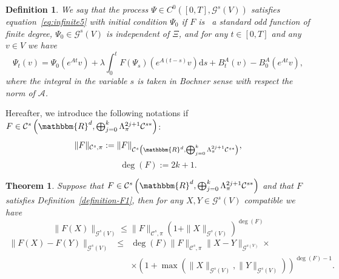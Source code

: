 \documentclass[11pt]{article}
\newcommand{\assign}{:=}
\newcommand{\asterisk}{\mathord{*}}
\newcommand{\mathd}{\mathrm{d}}
\newtheorem{definition}{Definition}
\newtheorem{theorem}{Theorem}
\begin{document}
\begin{definition}
  \label{definition_F2}We say that the process $\Psi \in C^0 ([0, T],
  \mathcal{G}^s (V))$ satisfies equation~{\eqref{eq:infinite5}} with initial
  condition $\Psi_0$ if $F$ is \ a standard odd function of finite degree,
  $\Psi_0 \in \mathcal{G}^s (V)$ is independent of $\Xi$, and for any $t \in
  [0, T]$ and any $v \in V$ we have
  \begin{equation}
    \Psi_t (v) = \Psi_0 (e^{A t} v) + \lambda \int_0^t F (\Psi_s) (e^{A (t -
    s)} v) \mathd s + B^A_t (v) - B_0^A (e^{A t} v) \label{eq:infinite2},
  \end{equation}
  where the integral in the variable $s$ is taken in Bochner sense with
  respect the norm of $\mathcal{A}$.
\end{definition}

Hereafter, we introduce the following notations if $F \in \mathcal{C}^s \left(
\mathbbm{R}^d, \bigoplus_{j = 0}^k \Lambda^{2 j + 1}_{\pi} \mathcal{C}^{s
\asterisk} \right)$:
\[ \| F \|_{\mathcal{C}^s, \pi} \assign \| F \|_{\mathcal{C}^s \left(
   \mathbbm{R}^d, \bigoplus_{j = 0}^k \Lambda^{2 j + 1}_{\pi} \mathcal{C}^{s
   \asterisk} \right)}, \]
\[ \deg (F) \assign 2 k + 1. \]
\begin{theorem}
  \label{theorem_drift}Suppose that $F \in \mathcal{C}^s \left( \mathbbm{R}^d,
  \bigoplus_{j = 0}^k \Lambda^{2 j + 1}_{\pi} \mathcal{C}^{s \asterisk}
  \right)$ and that $F$ satisfies Definition~\ref{definition-F1}, then for any
  $X, Y \in \mathcal{G}^s (V)$ compatible we have
  \begin{equation}
    \| F (X) \|_{\mathcal{G}^s (V)} \leqslant \| F \|_{\mathcal{C}^s, \pi} (1
    + \| X \|_{\mathcal{G}^s (V)})^{\deg (F)} \label{eq:propertyF1}
  \end{equation}
  \begin{eqnarray}
    \| F (X) - F (Y) \|_{\mathcal{G}^s (V)} & \leqslant & \deg (F) \| F
    \|_{\mathcal{C}^s, \pi} \| X - Y \|_{\mathcal{G}^{s (V)}} \times
    \nonumber\\
    &  & \times (1 + \max (\| X \|_{\mathcal{G}^s (V)}, \| Y
    \|_{\mathcal{G}^s (V)}))^{\deg (F) - 1} .  \label{eq:propertyF2}
  \end{eqnarray}
\end{theorem}
\end{document}
